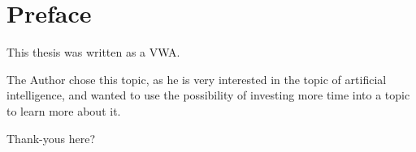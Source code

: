 \chapter{Preface}
This thesis was written as a VWA.

The Author chose this topic, as he is very interested in the topic of artificial intelligence, and wanted to use the possibility of investing more time into a topic to learn more about it.

Thank-yous here?
